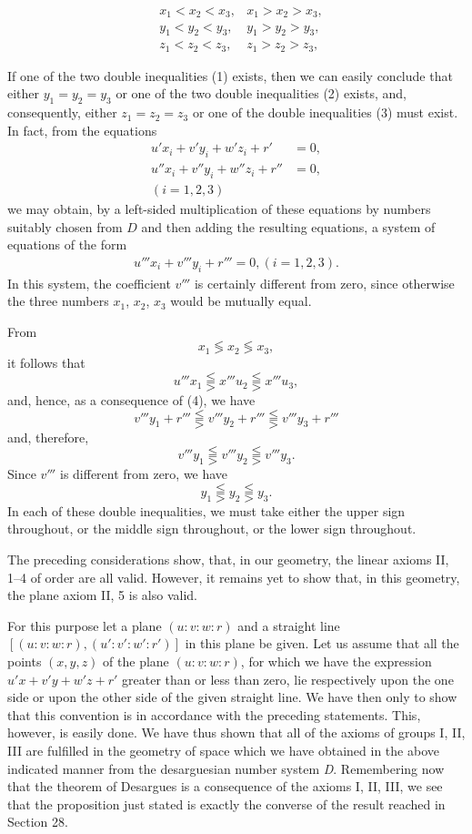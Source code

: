 \documentclass[11pt,oneside]{book}
\begin{document}
\begin{eqnarray}
&x_1 < x_2 < x_3, &x_1 > x_2 > x_3,
 \\%
&y_1 < y_2 < y_3, &y_1 > y_2 > y_3,
 \\%
&z_1 < z_2 < z_3, &z_1 > z_2 > z_3,%
\end{eqnarray}

If one of the two double inequalities (1) exists, then
we can easily conclude that either $y_1 = y_2 = y_3$ or one
of the two double inequalities (2) exists, and, consequently,
either $z_1 = z_2 = z_3$ or one of the double inequalities
(3) must exist. In fact, from the equations
\begin{align*}
u'x_i +  v'y_i +  w'z_i +  r' & =  0,\\
u''x_i +  v''y_i +  w''z_i +  r'' & =  0,\\
(i = 1,2,3)
\end{align*}
we may obtain, by a left-sided multiplication of these
equations by numbers suitably chosen from $D$ and
then adding the resulting equations, a system of equations
of the form
\begin{eqnarray}
u'''x_i + v'''y_i + r''' = 0, (i = 1, 2, 3).
\end{eqnarray}
In this system, the coefficient $v'''$ is certainly different
from zero, since otherwise the three numbers $x_1$, $x_2$, $x_3$
would be mutually equal.

From
\[
x_1 \lessgtr x_2 \lessgtr x_3,
\]
it follows that
\[
u'''x_1 \lesseqqgtr x'''u_2 \lesseqqgtr x'''u_3,
\]
and, hence, as a consequence of (4), we have
\[
v'''y_1 + r''' \lesseqqgtr v'''y_2 + r''' \lesseqqgtr
v'''y_3 + r'''
\]
and, therefore,
\[
v'''y_1 \lesseqqgtr v'''y_2 \lesseqqgtr v'''y_3.
\]
Since $v'''$ is different from zero, we have
\[
y_1 \lesseqqgtr y_2 \lesseqqgtr y_3.
\]
In each of these double inequalities, we must take
either the upper sign throughout, or the middle sign
throughout, or the lower sign throughout.

The preceding considerations show, that, in our
geometry, the linear axioms II, 1--4 of order are all
valid. However, it remains yet to show that, in this
geometry, the plane axiom II, 5 is also valid.

For this purpose let a plane $(u:v:w:r)$ and a
straight line $[(u:v:w:r), (u':v':w':r')]$ in this plane
be given. Let us assume that all the points $(x, y, z)$
of the plane $(u:v:w:r)$, for which we have the expression
$u'x + v'y + w'z + r'$ greater than or less than
zero, lie respectively upon the one side or upon the
other side of the given straight line. We have then
only to show that this convention is in accordance
with the preceding statements. This, however, is
easily done.
We have thus shown that all of the axioms of
groups I, II, III are fulfilled in the geometry of space
which we have obtained in the above indicated manner
from the desarguesian number system \textit{D}. Remembering
now that the theorem of Desargues is a
consequence of the axioms I, II, III, we see that the
proposition just stated is exactly the converse of the
result reached in Section 28.
\end{document}
